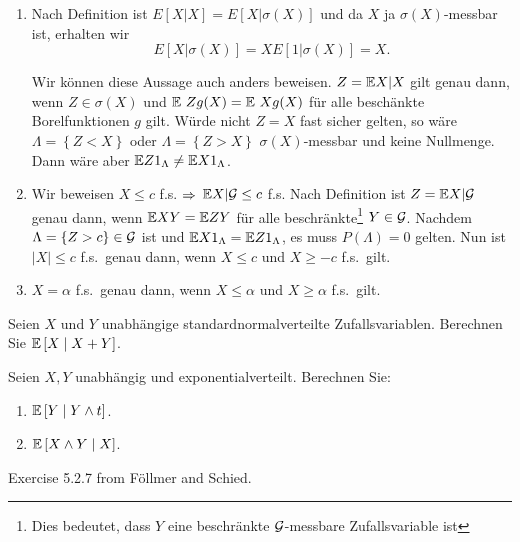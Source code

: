 \solution 
\begin{enumerate}
    \item 
        Nach Definition ist $E\left[ X| X \right]=E\left[ X|\sigma\left( X
        \right) \right]$ und da $X$ ja $\sigma\left( X \right)$-messbar ist,
        erhalten wir \begin{equation*} E\left[ X|\sigma\left( X \right)
            \right]= X E\left[ 1 | \sigma\left( X \right) \right] =X.
        \end{equation*}

        Wir können diese Aussage auch anders beweisen. $Z= \mathbb{E} X | X$ gilt genau
        dann, wenn $Z \in \sigma(X)$ und $\mathbb{E}\ Z g(X) = \mathbb{E}\ X g(X)$ für alle
        beschänkte Borelfunktionen $g$ gilt.  Würde nicht $Z = X$ fast sicher
        gelten, so wäre $\Lambda=\left\{ Z< X \right\}$ oder $\Lambda= \left\{
        Z > X \right\}$ $\sigma(X)$-messbar und keine Nullmenge. Dann wäre aber
        $\mathbb{E} Z 1_{\Lambda} \neq \mathbb{E} X 1_{\Lambda}$.
    \item Wir beweisen $X \leq c$ f.s. $\Rightarrow$ $ \mathbb{E} X | \mathcal G \leq c$ f.s. Nach
        Definition ist $Z=\mathbb{E} X|\mathcal G$ genau dann, wenn $\mathbb{E} X Y = \mathbb{E} Z Y$ für alle
        beschränkte\footnote{Dies bedeutet, dass $Y$ eine beschränkte
        $\mathcal G$-messbare Zufallsvariable ist} $Y\in \mathcal G$. Nachdem $\Lambda =
        \left\{ Z>c \right\} \in \mathcal G$ ist und $\mathbb{E} X 1_\Lambda = \mathbb{E} Z
        1_\Lambda$, es muss $P\left( \Lambda \right)=0$ gelten.  Nun ist $| X |
        \leq c$ f.s.\ genau dann, wenn $X \leq c$ und $ X \geq -c$ f.s.\ gilt.
    \item $X=\alpha$ f.s.\ genau dann, wenn $X \leq \alpha$ und $ X \geq
        \alpha$ f.s.\ gilt.
\end{enumerate}




 Seien $X$ und $Y$ unabhängige
standardnormalverteilte Zufallsvariablen. Berechnen Sie $\mathbb{E}\left[ X \;\middle\vert\; X+Y
\right]$.


 Seien $X,Y$ unabhängig
und exponentialverteilt. Berechnen Sie:
\begin{enumerate}
    \item $\mathbb{E}\left[ Y \;\middle\vert\; Y \wedge t \right]$.
    \item $\mathbb{E} \left[ X \wedge Y \;\middle\vert\; X \right]$.
\end{enumerate}


 Exercise 5.2.7 from
Föllmer and Schied.



